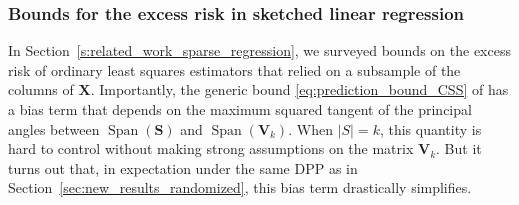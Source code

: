 \documentclass[twoside,11pt]{book}
\newtheorem{proposition}{Proposition}
\DeclareMathOperator{\Span}{\mathrm{Span}}
\DeclareMathOperator{\DPP}{\mathrm{DPP}}
\DeclareMathOperator{\eff}{\mathrm{eff}}
\DeclareMathOperator{\EX}{\mathbb{E}}
\begin{document}
\subsubsection{Bounds for the excess risk in sketched linear regression}
\label{sec:bounds_for_regression_under_dpp}

 In Section~\ref{s:related_work_sparse_regression}, we surveyed bounds on the excess risk of ordinary least squares estimators that relied on a subsample of the columns of $\bm{X}$.
Importantly, the generic bound \eqref{eq:prediction_bound_CSS} of \cite{LiHa18} has a bias term that depends on the maximum squared tangent of the principal angles between $\Span(\bm{S})$ and $\Span(\bm{V}_k)$. When $|S| = k$, this quantity is hard to control without making strong assumptions on the matrix $\bm{V}_{k}$.
But it turns out that, in expectation under the same DPP as in Section~\ref{sec:new_results_randomized}, this bias term drastically simplifies.
\end{document}

